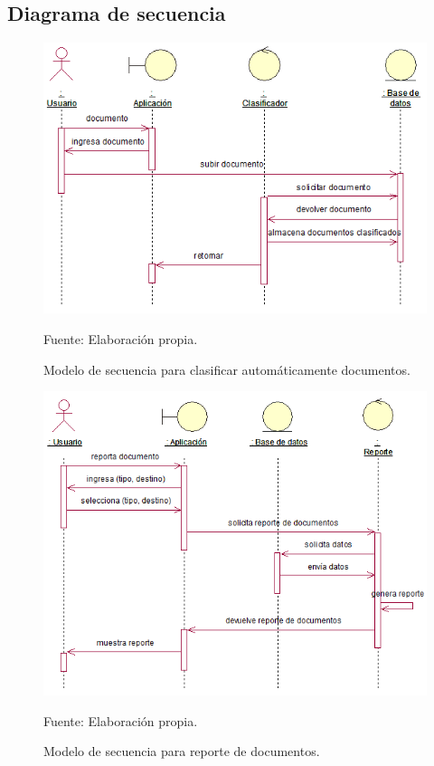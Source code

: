 \subsection{Diagrama de secuencia}
\begin{figure}[h!]
	\centering
		\includegraphics[scale=0.5]{imagenes/dsecuencia222.png}
		\caption{Modelo de secuencia para clasificar automáticamente documentos.}
	\begin{center}
    Fuente: Elaboración propia.
    \end{center}
	\label{fig:dsecuencia222}
\end{figure}
\begin{figure}[h!]
	\centering
		\includegraphics[scale=0.5]{imagenes/dsecuencia2.png}
		\caption{Modelo de secuencia para reporte de documentos.}
	\begin{center}
    Fuente: Elaboración propia.
    \end{center}
	\label{fig:dsecuencia2}
\end{figure}
\newpage



